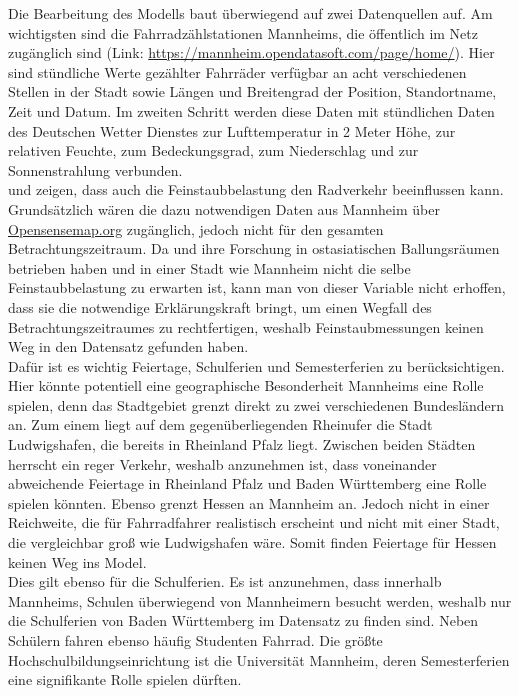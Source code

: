 \documentclass[a4paper,12pt]{thesis}
\begin{document}
Die Bearbeitung des Modells baut überwiegend auf zwei Datenquellen auf. Am wichtigsten sind die Fahrradzählstationen Mannheims, die öffentlich im Netz zugänglich sind (Link: \url{https://mannheim.opendatasoft.com/page/home/}). Hier sind stündliche Werte gezählter Fahrräder verfügbar an acht verschiedenen Stellen in der Stadt sowie Längen und Breitengrad der Position, Standortname, Zeit und Datum. Im zweiten Schritt werden diese Daten mit stündlichen Daten des Deutschen Wetter Dienstes zur Lufttemperatur in 2 Meter Höhe, zur relativen Feuchte, zum Bedeckungsgrad, zum Niederschlag und zur Sonnenstrahlung verbunden.\\
\cite{ZHAO2018826} und \cite{Hong2022} zeigen, dass auch die Feinstaubbelastung den Radverkehr beeinflussen kann. Grundsätzlich wären die dazu notwendigen Daten aus Mannheim über \url{Opensensemap.org} zugänglich, jedoch nicht für den gesamten Betrachtungszeitraum. Da \cite{ZHAO2018826} und \cite{Hong2022} ihre Forschung in ostasiatischen Ballungsräumen betrieben haben und in einer Stadt wie Mannheim nicht die selbe Feinstaubbelastung zu erwarten ist, kann man von dieser Variable nicht erhoffen, dass sie die notwendige Erklärungskraft bringt, um einen Wegfall des Betrachtungszeitraumes zu rechtfertigen, weshalb Feinstaubmessungen keinen Weg in den Datensatz gefunden haben.\\
Dafür ist es wichtig Feiertage, Schulferien und Semesterferien zu berücksichtigen. Hier könnte potentiell eine geographische Besonderheit Mannheims eine Rolle spielen, denn das Stadtgebiet grenzt direkt zu zwei verschiedenen Bundesländern an. Zum einem liegt auf dem gegenüberliegenden Rheinufer die Stadt Ludwigshafen, die bereits in Rheinland Pfalz liegt. Zwischen beiden Städten herrscht ein reger Verkehr, weshalb anzunehmen ist, dass voneinander abweichende Feiertage in Rheinland Pfalz und Baden Württemberg eine Rolle spielen könnten. Ebenso grenzt Hessen an Mannheim an. Jedoch nicht in einer Reichweite, die für Fahrradfahrer realistisch erscheint und nicht mit einer Stadt, die vergleichbar groß wie Ludwigshafen wäre. Somit finden Feiertage für Hessen keinen Weg ins Model.\\
Dies gilt ebenso für die Schulferien. Es ist anzunehmen, dass innerhalb Mannheims, Schulen überwiegend von Mannheimern besucht werden, weshalb nur die Schulferien von Baden Württemberg im Datensatz zu finden sind. Neben Schülern fahren ebenso häufig Studenten Fahrrad. Die größte Hochschulbildungseinrichtung ist die Universität Mannheim, deren Semesterferien eine signifikante Rolle spielen dürften.
\end{document}
